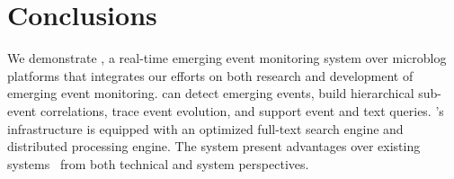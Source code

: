
\section{Conclusions}
We demonstrate \ring, a real-time emerging event monitoring system over microblog platforms
that integrates our efforts on both research and development of emerging event monitoring.
\ring can detect emerging events, build hierarchical sub-event correlations, trace event evolution, and support event and text queries.
\ring's infrastructure is equipped with an optimized full-text search engine and distributed processing engine.
The system present advantages over existing systems~\cite{mathioudakis2010twittermonitor,xie2014clear, schubert2014signitrend} from both technical and system perspectives.








\balance
